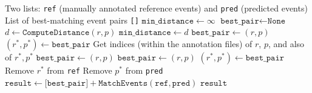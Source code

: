 
\begin{algorithm}[ht]
\caption{Recursive Best Match}
\scriptsize
\label{alg:recursive_match}
\begin{algorithmic}[1]
\Require Two lists: \texttt{ref} (manually annotated reference events) and \texttt{pred} (predicted events)
\Ensure List of best-matching event pairs
        \State \Return \texttt{[]}
    \EndIf
    \State $\texttt{min\_distance} \gets \infty$
    \State $\texttt{best\_pair} \gets \texttt{None}$
            \State $d \gets \texttt{ComputeDistance}(r, p)$
                \State $\texttt{min\_distance} \gets d$
                \State $\texttt{best\_pair} \gets (r, p)$
                \State $(r^*, p^*) \gets \texttt{best\_pair}$
                \State Get indices (within the annotation files) of $r$, $p$, and also of $r^*, p^*$
                    \State $\texttt{best\_pair} \gets (r, p)$
                    \State $\texttt{best\_pair} \gets (r, p)$
                \EndIf
            \EndIf
        \EndFor
    \EndFor
    \State $(r^*,p^*) \gets \texttt{best\_pair}$
    \State Remove $r^*$ from \texttt{ref}
    \State Remove $p^*$ from \texttt{pred}
    \State $\texttt{result} \gets \texttt{[best\_pair]} + \texttt{MatchEvents}(\texttt{ref}, \texttt{pred})$
    \State \Return $\texttt{result}$
\EndFunction
\end{algorithmic}
\end{algorithm}